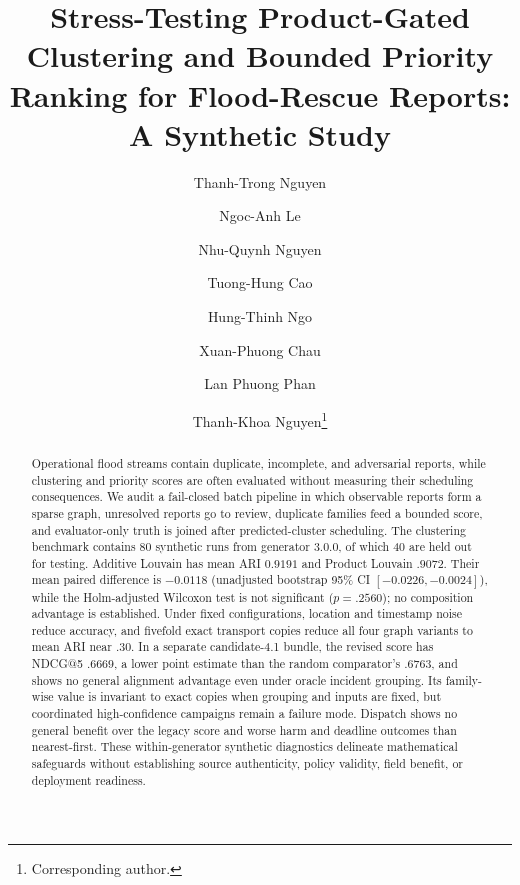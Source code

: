 \documentclass[runningheads]{llncs}
\begin{document}
\title{Stress-Testing Product-Gated Clustering and Bounded Priority Ranking
for Flood-Rescue Reports: A Synthetic Study}

\author{Thanh-Trong Nguyen \and
Ngoc-Anh Le \and
Nhu-Quynh Nguyen \and
Tuong-Hung Cao \and
Hung-Thinh Ngo \and
Xuan-Phuong Chau \and
Lan Phuong Phan \and
Thanh-Khoa Nguyen\thanks{Corresponding author.}}

\maketitle

\begin{abstract}
Operational flood streams contain duplicate, incomplete, and adversarial
reports, while clustering and priority scores are often evaluated without
measuring their scheduling consequences. We audit a fail-closed batch
pipeline in which observable reports form a sparse graph, unresolved reports
go to review, duplicate families feed a bounded score, and evaluator-only
truth is joined after predicted-cluster scheduling. The clustering benchmark
contains 80 synthetic runs from generator 3.0.0, of which 40 are held out for
testing. Additive Louvain has mean ARI $0.9191$ and Product Louvain $.9072$.
Their mean paired difference is $-0.0118$ (unadjusted bootstrap 95\% CI
$[-0.0226,-0.0024]$), while the Holm-adjusted Wilcoxon test is not significant
($p=.2560$); no composition advantage is established. Under fixed
configurations, location and timestamp noise reduce accuracy, and fivefold
exact transport copies reduce all four graph variants to mean ARI near $.30$.
In a separate candidate-4.1 bundle, the revised score has NDCG@5 $.6669$, a
lower point estimate than the random comparator's $.6763$, and shows no
general alignment advantage even under oracle incident grouping. Its
family-wise value is invariant to exact copies when grouping and inputs are
fixed, but coordinated high-confidence campaigns remain a failure mode.
Dispatch shows no general benefit over the legacy score and worse harm and
deadline outcomes than nearest-first. These within-generator synthetic
diagnostics delineate mathematical safeguards without establishing source
authenticity, policy validity, field benefit, or deployment readiness.
\end{abstract}
\end{document}

